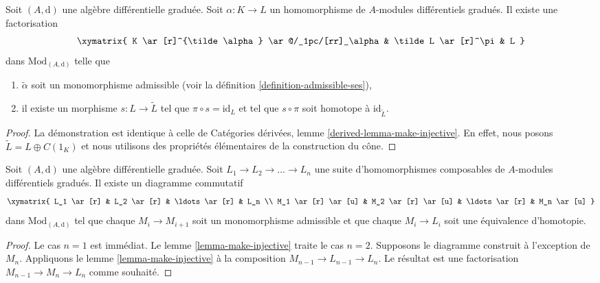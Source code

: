 \begin{lemma}
\label{lemma-make-injective}
Soit $(A, \text{d})$ une algèbre différentielle
graduée. Soit $\alpha : K \to L$ un homomorphisme de $A$-modules
différentiels gradués. Il existe une factorisation
$$
\xymatrix{
K \ar[r]^{\tilde \alpha} \ar@/_1pc/[rr]_\alpha &
\tilde L \ar[r]^\pi & L
}
$$
dans $\text{Mod}_{(A, \text{d})}$ telle que
\begin{enumerate}
\item $\tilde \alpha$ soit un monomorphisme admissible (voir
la définition \ref{definition-admissible-ses}),
\item il existe un morphisme $s : L \to \tilde
L$ tel que $\pi \circ s = \text{id}_L$ et tel que
$s \circ \pi$ soit homotope à $\text{id}_{\tilde L}$.
\end{enumerate}
\end{lemma}

\begin{proof}
La démonstration est identique à celle de
Catégories dérivées, lemme \ref{derived-lemma-make-injective}. En effet,
nous posons $\tilde L = L \oplus C(1_K)$ et nous utilisons des propriétés
élémentaires de la construction du cône.
\end{proof}

\begin{lemma}
\label{lemma-sequence-maps-split}
Soit $(A, \text{d})$ une algèbre différentielle
graduée. Soit $L_1 \to L_2 \to \ldots \to
L_n$ une suite d'homomorphismes composables de
$A$-modules différentiels gradués.
Il existe un diagramme commutatif
$$
\xymatrix{
L_1 \ar[r] &
L_2 \ar[r] &
\ldots \ar[r] &
L_n \\ M_1
\ar[r] \ar[u] & M_2
\ar[r] \ar[u] & \ldots
\ar[r] & M_n
\ar[u]
}
$$
dans $\text{Mod}_{(A, \text{d})}$ tel que chaque $M_i \to M_{i + 1}$ soit
un monomorphisme admissible et que chaque $M_i \to L_i$ soit
une équivalence d'homotopie.
\end{lemma}

\begin{proof}
Le cas $n = 1$ est immédiat. Le lemme
\ref{lemma-make-injective} traite le cas $n = 2$.
Supposons le diagramme construit à l'exception
de $M_n$. Appliquons le lemme \ref{lemma-make-injective} à la
composition $M_{n - 1} \to L_{n - 1} \to L_n$. Le
résultat est une factorisation $M_{n - 1} \to M_n \to L_n$ comme
souhaité.
\end{proof}



